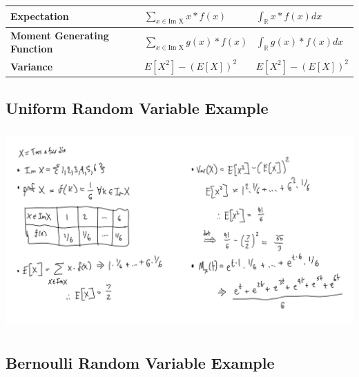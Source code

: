 \documentclass{article}
\begin{document}
\begin{table}[!htb]
\begin{tabular}{|l|l|l|}
    \textbf{Expectation}                                                            & $\displaystyle\sum_{x \in \text{Im X}} x*f(x)$                                                                        & $\displaystyle\int_{\mathbb{R}} x*f(x)dx$                                                                  \\ \hline
    \textbf{Moment Generating Function}                                                         & $\displaystyle\sum_{x \in \text{Im X}} g(x)*f(x)$                                             & $\displaystyle\int_{\mathbb{R}} g(x)*f(x) dx$                                           \\ \hline
    \textbf{Variance}                                                              & $E\left[X^2\right] - \left(E\left[X\right]\right)^2$                                 & $E\left[X^2\right] - \left(E\left[X\right]\right)^2$                                    \\ \hline
    \end{tabular}
\end{table}

\subsection{Uniform Random Variable Example}

\begin{center}
    \includegraphics[height=3in]{q2.jpeg}
\end{center}

\subsection{Bernoulli Random Variable Example}
\end{document}

